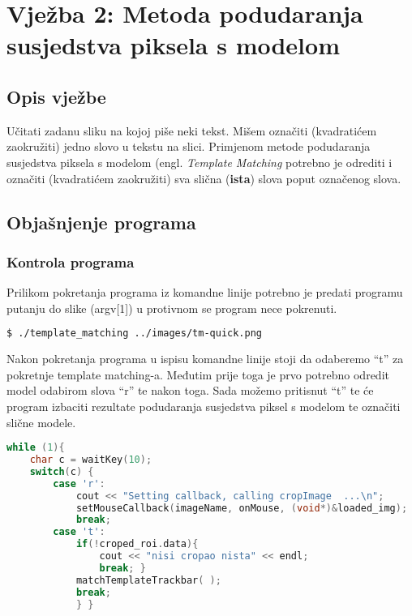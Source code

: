 \section{Vježba 2: Metoda podudaranja susjedstva piksela s modelom}

\subsection{Opis vježbe}
Učitati zadanu sliku na kojoj piše neki tekst. Mišem označiti
(kvadratićem zaokružiti) jedno slovo u tekstu na slici. Primjenom metode
podudaranja susjedstva piksela s modelom (engl. \textit{Template
Matching} potrebno je odrediti i označiti (kvadratićem zaokružiti) sva
slična (\textbf{ista}) slova poput označenog slova.

\subsection{Objašnjenje programa}

\subsubsection{Kontrola programa}

Prilikom pokretanja programa iz komandne linije potrebno je 
predati programu putanju do slike (argv[1]) u protivnom se program 
nece pokrenuti. \\

\begin{lstlisting}[language=bash,caption={Pokretanje programa iz
    komandne linije}]
$ ./template_matching ../images/tm-quick.png
\end{lstlisting}

Nakon pokretanja programa u ispisu komandne linije stoji da odaberemo
``t'' za pokretnje template matching-a. Međutim prije toga je prvo
potrebno odredit model odabirom slova ``r'' te nakon toga. Sada možemo
pritisnut ``t'' te će program izbaciti rezultate podudaranja susjedstva
piksel s modelom te označiti slične modele.
\\

\begin{lstlisting}[language=C,caption={Kontrola programa tipkovnicom}]
while (1){
    char c = waitKey(10);
    switch(c) {
        case 'r':
            cout << "Setting callback, calling cropImage  ...\n";
            setMouseCallback(imageName, onMouse, (void*)&loaded_img);
            break;
        case 't':
            if(!croped_roi.data){
                cout << "nisi cropao nista" << endl;
                break; }
            matchTemplateTrackbar( );
            break;
            } }
\end{lstlisting}

